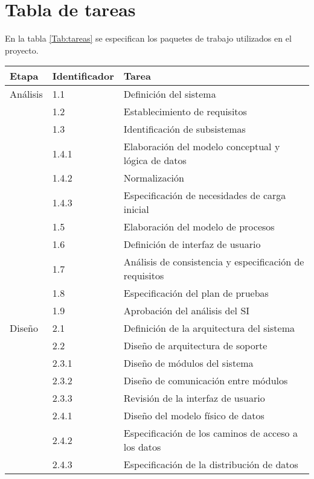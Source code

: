 \documentclass[11pt,a4paper,spanish,twoside]{report}
\begin{document}
\section{Tabla de tareas}
En la tabla \ref{Tab:tareas} se especifican los paquetes de trabajo
utilizados en el proyecto. 
\begin{table}[!h]
\centering
  \begin{tabular}{p{3cm}|p{3cm}|p{7cm}|}
    \textbf{Etapa} & \textbf{Identificador} & \textbf{Tarea} \\
    \hline \hline
    Análisis & 1.1 & Definición del sistema\\ 
    \cline{2-3}
    & 1.2 & Establecimiento de requisitos\\
    \cline{2-3}
    & 1.3 & Identificación de subsistemas\\
    \cline{2-3}
    & 1.4.1 & Elaboración del modelo conceptual y lógica de datos\\
    \cline{2-3}
    & 1.4.2 & Normalización\\
    \cline{2-3}
    & 1.4.3 & Especificación de necesidades de carga inicial\\
    \cline{2-3}
    & 1.5 & Elaboración del modelo de procesos\\
    \cline{2-3}
    & 1.6 & Definición de interfaz de usuario\\
    \cline{2-3}
    & 1.7 & Análisis de consistencia y especificación de requisitos\\
    \cline{2-3}
    & 1.8 & Especificación del plan de pruebas\\
    \cline{2-3}
    & 1.9 & Aprobación del análisis del SI\\
    \hline
    Diseño & 2.1 & Definición de la arquitectura del sistema\\
    \cline{2-3}
    & 2.2 & Diseño de arquitectura de soporte\\
    \cline{2-3}
    & 2.3.1 & Diseño de módulos del sistema\\
    \cline{2-3}
    & 2.3.2 & Diseño de comunicación entre módulos\\
    \cline{2-3}
    & 2.3.3 & Revisión de la interfaz de usuario\\
    \cline{2-3}
    & 2.4.1 & Diseño del modelo físico de datos\\
    \cline{2-3}
    & 2.4.2 & Especificación de los caminos de acceso a los datos\\
    \cline{2-3}
    & 2.4.3 & Especificación de la distribución de datos\\
    \cline{2-3}

\end{tabular}
\end{table}
\end{document}
